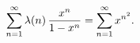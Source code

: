 \[\sum_{n=1}^{\infty}\mathop{\lambda\/}\nolimits\!\left(n\right)\frac{x^{n}}{1-x%
^{n}}=\sum_{n=1}^{\infty}x^{n^{2}}.\]